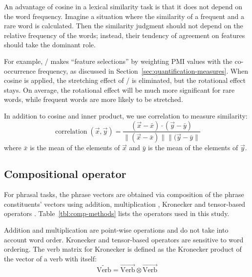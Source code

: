 An advantage of cosine in a lexical similarity task is that it does not depend on the word frequency. Imagine a situation where the similarity of a frequent and a rare word is calculated. Then the similarity judgment should not depend on the relative frequency of the words; instead, their tendency of agreement on features should take the dominant role.

For example, \NPMI/ makes ``feature selections'' by weighting PMI values with the co-occurrence frequency, as discussed in Section~\ref{sec:quantification-measures}. When cosine is applied, the stretching effect of \NPMI/ is eliminated, but the rotational effect stays. On average, the rotational effect will be much more significant for rare words, while frequent words are more likely to be stretched.

In addition to cosine and inner product, we use correlation \cite{kiela-clark:2014:CVSC} to measure similarity:
\begin{equation*}
  \label{eq:correlation}
  \operatorname{correlation}(\vec{x}, \vec{y}) = \frac{(\vec{x} - \bar{x}) \cdot (\vec{y} - \bar{y})}
                                {\|(\vec{x} - \bar{x})\| \|(\vec{y}-\bar{y}\|}
\end{equation*}
where $\bar{x}$ is the mean of the elements of $\vec{x}$ and $\bar{y}$ is the mean of the elements of $\vec{y}$.

\subsection{Compositional operator}
\label{sec:comp-oper}



For phrasal tasks, the phrase vectors are obtained via composition of the phrase constituents' vectors using addition, multiplication \cite{mitchell2010composition,mitchell-lapata:2008:ACLMain}, Kronecker \cite{Grefenstette:2011:ESC:2145432.2145580} and tensor-based operators \cite{DBLP:journals/corr/abs-1003-4394,kartsadrqpl2014,kartsaklis-sadrzadeh-pulman:2012:POSTERS,Grefenstette:2011:ESC:2145432.2145580}. Table~\ref{tbl:comp-methods} lists the operators used in this study.

Addition and multiplication are point-wise operations and do not take into account word order. Kronecker and tensor-based operators are sensitive to word ordering. The verb matrix for Kronecker is defined as the Kronecker product of the vector of a verb with itself:
%
\begin{equation*}
  \widetilde{\text{Verb}} = \overrightarrow{\text{Verb}} \otimes \overrightarrow{\text{Verb}}
\end{equation*}

